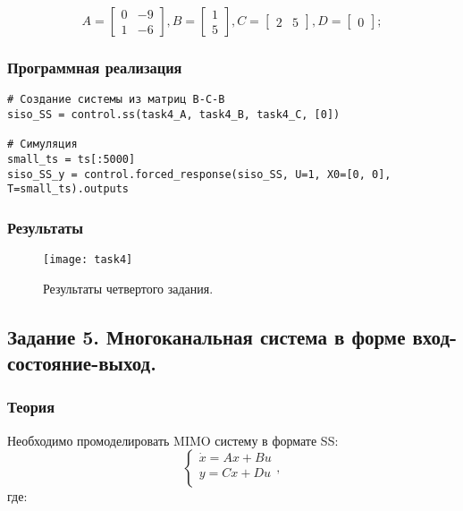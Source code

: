 \documentclass[16pt]{article}
\begin{document}
\[ 
    A = \begin{bmatrix}
        0 &  -9 \\
        1 &  -6 
        \end{bmatrix},
        B = \begin{bmatrix}
            1 \\
            5
            \end{bmatrix},
        C = \begin{bmatrix}
            2 & 5
            \end{bmatrix},
        D = \begin{bmatrix}
            0
            \end{bmatrix};
\]

\subsubsection{Программная реализация}
\begin{verbatim}
# Создание системы из матриц В-С-В
siso_SS = control.ss(task4_A, task4_B, task4_C, [0])

# Симуляция
small_ts = ts[:5000]
siso_SS_y = control.forced_response(siso_SS, U=1, X0=[0, 0], T=small_ts).outputs
\end{verbatim}

\subsubsection{Результаты}
\begin{figure}[H]
	\centering
	\texttt{[image: task4]}
	\caption{Результаты четвертого задания.}
	\label{fig:fig4}
\end{figure}


\newpage
\subsection{Задание 5. Многоканальная система в форме вход-состояние-выход.}
\subsubsection{Теория}
Необходимо промоделировать MIMO систему в формате SS:
\[ 
    \begin{cases}
        \dot{x} = Ax + Bu \\
        y = Cx + Du \\
    \end{cases},
\]
где:
\end{document}
